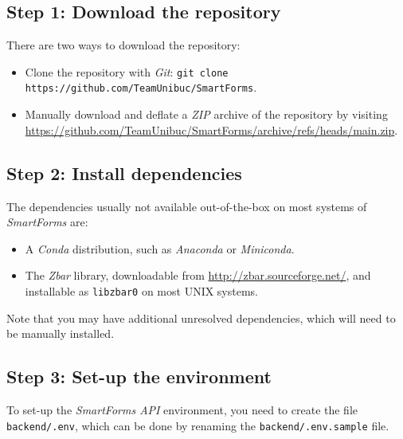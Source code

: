 \documentclass[11pt, a4paper]{report}
\def\code#1{\texttt{#1}}
\begin{document}
\subsection*{Step 1: Download the repository}

There are two ways to download the repository:
\begin{itemize}
	\item Clone the repository with \textit{Git}: \code{git clone https://github.com/TeamUnibuc/SmartForms}.
	\item Manually download and deflate a \textit{ZIP} archive of the repository by visiting \url{https://github.com/TeamUnibuc/SmartForms/archive/refs/heads/main.zip}.
\end{itemize}


\subsection*{Step 2: Install dependencies}

The dependencies usually not available out-of-the-box on most systems of \textit{SmartForms} are:
\begin{itemize}
	\item A \textit{Conda} distribution, such as \textit{Anaconda} or \textit{Miniconda}.
	\item The \textit{Zbar} library, downloadable from \url{http://zbar.sourceforge.net/}, and installable as \code{libzbar0} on most UNIX systems.
\end{itemize}

Note that you may have additional unresolved dependencies, which will need to be manually installed.

\subsection*{Step 3: Set-up the environment}

To set-up the \textit{SmartForms API} environment, you need to create the file \code{backend/.env}, which can be done by renaming the \code{backend/.env.sample} file.
\end{document}

